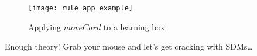 \pagebreak

\vspace*{2cm}

\begin{figure}[htp] 
\begin{center}
  \texttt{[image: rule\_app\_example]}
  \caption[]{Applying $moveCard$ to a learning box}
  \label{fig:rule_app_example}
\end{center}
\end{figure}

\vspace*{1cm}

Enough theory! Grab your mouse and let's get cracking with SDMs\ldots
